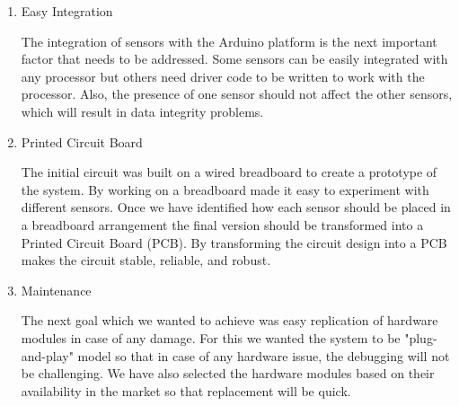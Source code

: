 \begin {enumerate}
 


\item {Easy Integration}

The integration of sensors with the Arduino platform is the next important factor that needs to be addressed. Some sensors can be easily integrated with any processor but others need driver code to be written to work with the processor. Also, the presence of one sensor should not affect the other sensors, which will result in data integrity problems.

\item {Printed Circuit Board}

The initial circuit was built on a wired breadboard to create a prototype of the system. By working on a breadboard made it easy to experiment with different sensors. Once we have identified how each sensor should be placed in a breadboard arrangement the final version should be transformed into a Printed Circuit Board (PCB). By transforming the circuit design into a PCB makes the circuit stable, reliable, and robust.


\item {Maintenance}

The next goal which we wanted to achieve was easy replication of hardware modules in case of any damage. For this we wanted the system to be "plug-and-play" model so that in case of any hardware issue, the debugging will not be challenging. We have also selected the hardware modules based on their availability in the market so that replacement will be quick.



\end{enumerate}
